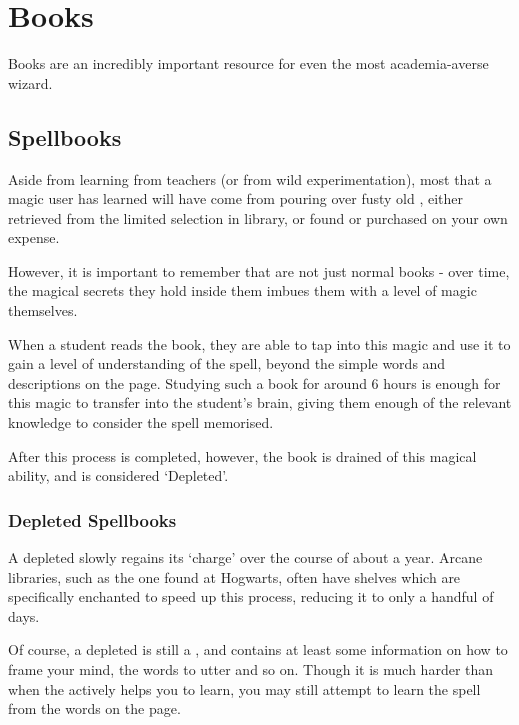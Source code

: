 \chapter{Books}\label{S:Books}

Books are an incredibly important resource for even the most academia-averse wizard.



\section{Spellbooks}\label{S:Spellbooks}

Aside from learning from teachers (or from wild experimentation), most  that a magic user has learned will have come from pouring over fusty old , either retrieved from the limited selection in  library, or found or purchased on your own expense.

However, it is important to remember that  are not just normal books - over time, the magical secrets they hold inside them imbues them with a level of magic themselves. 

When a student reads the book, they are able to tap into this magic and use it to gain a level of understanding of the spell, beyond the simple words and descriptions on the page. Studying such a book for around 6 hours is enough for this magic to transfer into the student's brain, giving them enough of the relevant knowledge to consider the spell memorised. 

After this process is completed, however, the book is drained of this magical ability, and is considered `Depleted'.


\subsection{Depleted Spellbooks}

A depleted  slowly regains its `charge' over the course of about a year. Arcane libraries, such as the one found at Hogwarts, often have shelves which are specifically enchanted to speed up this process, reducing it to only a handful of days. 

Of course, a depleted  is still a , and contains at least some information on how to frame your mind, the words to utter and so on. Though it is much harder than when the  actively helps you to learn, you may still attempt to learn the spell from the words on the page.

